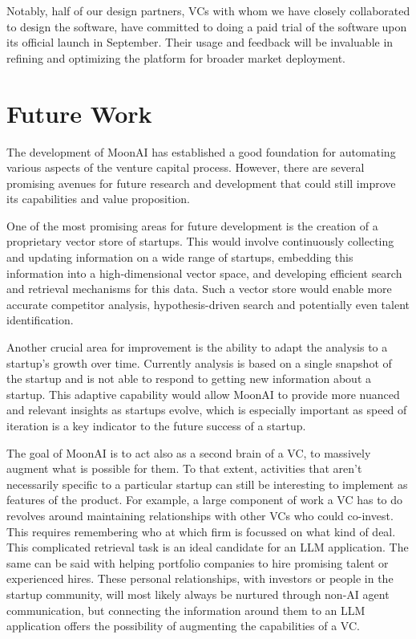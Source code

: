 \documentclass[a4paper, oneside]{discothesis}
\begin{document}
Notably, half of our design partners, VCs with whom we have closely collaborated to design the software, have committed to doing a paid trial of the software upon its official launch in September. Their usage and feedback will be invaluable in refining and optimizing the platform for broader market deployment.

\section{Future Work}

The development of MoonAI has established a good foundation for automating various aspects of the venture capital process. However, there are several promising avenues for future research and development that could still improve its capabilities and value proposition.

One of the most promising areas for future development is the creation of a proprietary vector store of startups. This would involve continuously collecting and updating information on a wide range of startups, embedding this information into a high-dimensional vector space, and developing efficient search and retrieval mechanisms for this data. Such a vector store would enable more accurate competitor analysis, hypothesis-driven search and potentially even talent identification.

Another crucial area for improvement is the ability to adapt the analysis to a startup's growth over time. Currently analysis is based on a single snapshot of the startup and is not able to respond to getting new information about a startup. This adaptive capability would allow MoonAI to provide more nuanced and relevant insights as startups evolve, which is especially important as speed of iteration is a key indicator to the future success of a startup. 

The goal of MoonAI is to act also as a second brain of a VC, to massively augment what is possible for them. To that extent, activities that aren't necessarily specific to a particular startup can still be interesting to implement as features of the product. For example, a large component of work a VC has to do revolves around maintaining relationships with other VCs who could co-invest. This requires remembering who at which firm is focussed on what kind of deal. This complicated retrieval task is an ideal candidate for an LLM application. The same can be said with helping portfolio companies to hire promising talent or experienced hires. These personal relationships, with investors or people in the startup community, will most likely always be nurtured through non-AI agent communication, but connecting the information around them to an LLM application offers the possibility of augmenting the capabilities of a VC. 
\end{document}
